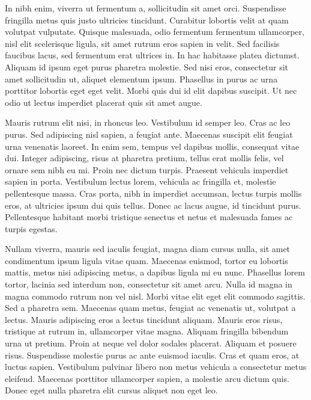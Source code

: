 \documentclass[twocolumn]{article}
\begin{document}
In nibh enim, viverra ut fermentum a, sollicitudin sit amet orci. Suspendisse fringilla metus quis justo ultricies tincidunt. Curabitur lobortis velit at quam volutpat vulputate. Quisque malesuada, odio fermentum fermentum ullamcorper, nisl elit scelerisque ligula, sit amet rutrum eros sapien in velit. Sed facilisis faucibus lacus, sed fermentum erat ultrices in. In hac habitasse platea dictumst. Aliquam id ipsum eget purus pharetra molestie. Sed nisi eros, consectetur sit amet sollicitudin ut, aliquet elementum ipsum. Phasellus in purus ac urna porttitor lobortis eget eget velit. Morbi quis dui id elit dapibus suscipit. Ut nec odio ut lectus imperdiet placerat quis sit amet augue.

Mauris rutrum elit nisi, in rhoncus leo. Vestibulum id semper leo. Cras ac leo purus. Sed adipiscing nisl sapien, a feugiat ante. Maecenas suscipit elit feugiat urna venenatis laoreet. In enim sem, tempus vel dapibus mollis, consequat vitae dui. Integer adipiscing, risus at pharetra pretium, tellus erat mollis felis, vel ornare sem nibh eu mi. Proin nec dictum turpis. Praesent vehicula imperdiet sapien in porta. Vestibulum lectus lorem, vehicula ac fringilla et, molestie pellentesque massa. Cras porta, nibh in imperdiet accumsan, lectus turpis mollis eros, at ultricies ipsum dui quis tellus. Donec ac lacus augue, id tincidunt purus. Pellentesque habitant morbi tristique senectus et netus et malesuada fames ac turpis egestas.

Nullam viverra, mauris sed iaculis feugiat, magna diam cursus nulla, sit amet condimentum ipsum ligula vitae quam. Maecenas euismod, tortor eu lobortis mattis, metus nisi adipiscing metus, a dapibus ligula mi eu nunc. Phasellus lorem tortor, lacinia sed interdum non, consectetur sit amet arcu. Nulla id magna in magna commodo rutrum non vel nisl. Morbi vitae elit eget elit commodo sagittis. Sed a pharetra sem. Maecenas quam metus, feugiat ac venenatis ut, volutpat a lectus. Mauris adipiscing eros a lectus tincidunt aliquam. Mauris eros risus, tristique at rutrum in, ullamcorper vitae magna. Aliquam fringilla bibendum urna ut pretium. Proin at neque vel dolor sodales placerat. Aliquam et posuere risus. Suspendisse molestie purus ac ante euismod iaculis. Cras et quam eros, at luctus sapien. Vestibulum pulvinar libero non metus vehicula a consectetur metus eleifend. Maecenas porttitor ullamcorper sapien, a molestie arcu dictum quis. Donec eget nulla pharetra elit cursus aliquet non eget leo.
\end{document}
